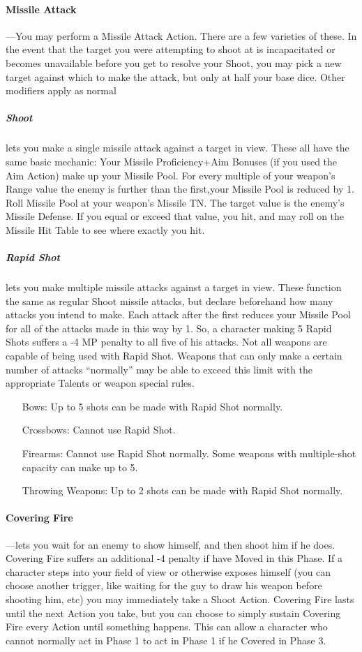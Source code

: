 \documentclass[oneside,11pt,english]{book}
\begin{document}
\paragraph{Missile Attack}---\quad You may perform a Missile Attack Action. There are a few varieties of these. In the event
that the target you were attempting to shoot at is incapacitated or becomes unavailable before you get to
resolve your Shoot, you may pick a new target against which to make the attack, but only at half your
base dice. Other modifiers apply as normal
\subparagraph{Shoot} lets you make a single missile attack against a target in view. These all have the same basic mechanic: Your Missile Proficiency+Aim Bonuses (if you used the Aim Action) make up your Missile Pool. For every multiple of your weapon’s Range value the enemy is further than the first,your Missile Pool is reduced by 1.
Roll Missile Pool at your weapon’s Missile TN. The target value is the enemy’s Missile Defense.
If you equal or exceed that value, you hit, and may roll on the Missile Hit Table to see where
exactly you hit.
\subparagraph{Rapid Shot} lets you make multiple missile attacks against a target in view. These function the
same as regular Shoot missile attacks, but declare beforehand how many attacks you intend to
make. Each attack after the first reduces your Missile Pool for all of the attacks made in this way by 1. So, a character making 5 Rapid Shots suffers a -4 MP penalty to all five of his attacks. Not
all weapons are capable of being used with Rapid Shot. Weapons that can only make a certain
number of attacks “normally” may be able to exceed this limit with the appropriate Talents or
weapon special rules.
\begin{itemize}
	\item [Bows:] Up to 5 shots can be made with Rapid Shot normally.
	\item	[Crossbows:] Cannot use Rapid Shot.
	\item	[Firearms:] Cannot use Rapid Shot normally. Some weapons with multiple-shot capacity can make up to 5.
	\item 	[Throwing Weapons:] Up to 2 shots can be made with Rapid Shot normally.
\end{itemize}

\paragraph{\label{par:Covering Fire} Covering Fire}---\quad lets you wait for an enemy to show himself, and then shoot him if he does.
Covering Fire suffers an additional -4 penalty if have Moved in this Phase. If a character steps
into your field of view or otherwise exposes himself (you can choose another trigger, like waiting
for the guy to draw his weapon before shooting him, etc) you may immediately take a Shoot
Action. Covering Fire lasts until the next Action you take, but you can choose to simply sustain
Covering Fire every Action until something happens. This can allow a character who cannot
normally act in Phase 1 to act in Phase 1 if he Covered in Phase 3.
\end{document}
